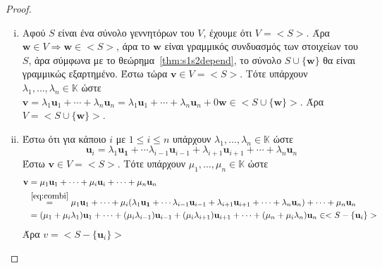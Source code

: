 \begin{proof}
\item {}
  \begin{enumerate}[i)]
    \item Αφού $S$ είναι ένα σύνολο γεννητόρων του $V$, έχουμε ότι 
      $ V = < S >  $.
      Άρα $ \mathbf{w} \in V \Rightarrow \mathbf{w} \in < S >  $, άρα το 
      $ \mathbf{w} $ είναι γραμμικός συνδυασμός των στοιχείων του $S$, 
      άρα σύμφωνα με το θεώρημα~\ref{thm:s1s2depend}, το σύνολο 
      $ S \cup \{ \mathbf{w} \} $ θα είναι γραμμικώς εξαρτημένο.
      Έστω τώρα  $ \mathbf{v} \in V = < S >  $. Τότε υπάρχουν 
      $ \lambda _{1}, \ldots, \lambda _{n} \in \mathbb{K} $ ώστε 
      $ \mathbf{v} = \lambda _{1} \mathbf{u}_{1}+ \cdots + \lambda _{n} 
      \mathbf{u}_{n} = \lambda _{1} \mathbf{u}_{1}+ \cdots + \lambda _{n} 
      \mathbf{u}_{n} + 0 \mathbf{w} \in < S  \cup \{ \mathbf{w}  \} > $. Άρα 
      $ V = < S \cup \{ \mathbf{w} \} >  $.
    \item Έστω ότι για κάποιο $ i $ με $ 1 \leq i \leq n $ υπάρχουν 
      $ \lambda _{1}, \ldots, \lambda _{n} \in \mathbb{K} $ ώστε 
      \begin{equation*}
        \label{eq:combi}
        \mathbf{u}_{i} = \lambda _{1} \mathbf{u_{1}} + \cdots \lambda _{i-1}
        \mathbf{u}_{i-1} + \lambda _{i+1} \mathbf{u}_{i+1} + \cdots + 
        \lambda _{n} \mathbf{u}_{n} 
      \end{equation*}
      Έστω $ \mathbf{v} \in V = < S > $. Τότε υπάρχουν $ \mu _{1}, \ldots, 
      \mu _{n} \in \mathbb{K} $ ώστε 
      \begin{align*} 
    \mathbf{v} &= 
    \mu _{1} \mathbf{u}_{1} + \cdots + \mu _{i} \mathbf{u}_{i} + \cdots + 
    \mu _{n} \mathbf{u}_{n} \\ 
               &\overset{\ref{eq:combi}}{=} 
               \mu _{1} \mathbf{u}_{1} + \cdots + \mu _{i} (\lambda _{1} 
               \mathbf{u_{1}} + \cdots \lambda _{i-1}
               \mathbf{u}_{i-1} + \lambda _{i+1} \mathbf{u}_{i+1} + 
               \cdots + \lambda _{n} \mathbf{u}_{n}) + \cdots + \mu _{n} 
               \mathbf{u}_{n} \\
               &=(\mu _{1}+ \mu _{i}\lambda_{1}) \mathbf{u}_{1} + \cdots + 
               (\mu _{i} \lambda _{i-1}) \mathbf{u}_{i-1} + (\mu _{i} 
               \lambda _{i+1}) \mathbf{u}_{i+1} + \cdots + (\mu _{n} + 
               \mu _{i} \lambda _{n}) \mathbf{u}_{n} \in 
               < S - \{ \mathbf{u}_{i} \} >  
  \end{align*}
  Άρα $ v = < S - \{ \mathbf{u}_{i} \} >  $
    \end{enumerate}
\end{proof}

